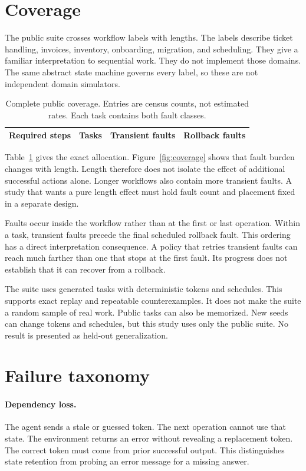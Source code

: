 \documentclass{article}
\begin{document}
\section{Coverage}

The public suite crosses workflow labels with lengths. The labels describe ticket handling, invoices, inventory, onboarding, migration, and scheduling. They give a familiar interpretation to sequential work. They do not implement those domains. The same abstract state machine governs every label, so these are not independent domain simulators.\par
\begin{table}[t]\centering
\caption{Complete public coverage. Entries are census counts, not estimated rates. Each task contains both fault classes.}\label{tab:coverage}
\begin{tabular}{rrrr}\toprule Required steps & Tasks & Transient faults & Rollback faults\\\midrule
\end{tabular}\end{table}
Table~\ref{tab:coverage} gives the exact allocation. Figure~\ref{fig:coverage} shows that fault burden changes with length. Length therefore does not isolate the effect of additional successful actions alone. Longer workflows also contain more transient faults. A study that wants a pure length effect must hold fault count and placement fixed in a separate design.\par
Faults occur inside the workflow rather than at the first or last operation. Within a task, transient faults precede the final scheduled rollback fault. This ordering has a direct interpretation consequence. A policy that retries transient faults can reach much farther than one that stops at the first fault. Its progress does not establish that it can recover from a rollback.\par
The suite uses generated tasks with deterministic tokens and schedules. This supports exact replay and repeatable counterexamples. It does not make the suite a random sample of real work. Public tasks can also be memorized. New seeds can change tokens and schedules, but this study uses only the public suite. No result is presented as held-out generalization.\par
\section{Failure taxonomy}
\paragraph{Dependency loss.} The agent sends a stale or guessed token. The next operation cannot use that state. The environment returns an error without revealing a replacement token. The correct token must come from prior successful output. This distinguishes state retention from probing an error message for a missing answer.
\end{document}
